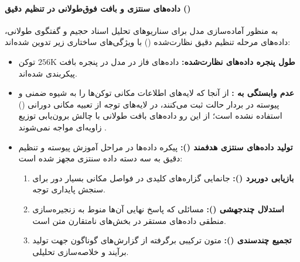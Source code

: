 \paragraph*{داده‌های سنتزی و بافت فوق‌طولانی در تنظیم دقیق ()}
به منظور آماده‌سازی مدل برای سناریوهای تحلیل اسناد حجیم و گفتگوی طولانی، داده‌های مرحله تنظیم دقیق نظارت‌شده () با ویژگی‌های ساختاری زیر تدوین شده‌اند:
\begin{itemize}
    \item \textbf{طول پنجره داده‌های نظارت‌شده:} داده‌های فاز  در مدل  در پنجره بافت $256\text{K}$ توکن پیکربندی شده‌اند.
    \item \textbf{عدم وابستگی به :} از آنجا که لایه‌های  اطلاعات مکانی توکن‌ها را به شیوه ضمنی و پیوسته در بردار حالت ثبت می‌کنند، در لایه‌های توجه از تعبیه مکانی دورانی () استفاده نشده است؛ از این رو داده‌های بافت طولانی با چالش برون‌یابی توزیع زاویه‌ای مواجه نمی‌شوند \cite{puvvada2025swan}.
    \item \textbf{تولید داده‌های سنتزی هدفمند ():} پیکره داده‌ها در مراحل آموزش پیوسته و تنظیم دقیق به سه دسته داده سنتزی مجهز شده است:
    \begin{enumerate}
        \item \textbf{بازیابی دوربرد ():} جانمایی گزاره‌های کلیدی در فواصل مکانی بسیار دور برای سنجش پایداری توجه.
        \item \textbf{استدلال چندجهشی ():} مسائلی که پاسخ نهایی آن‌ها منوط به زنجیره‌سازی منطقی داده‌های مستقر در بخش‌های نامتقارن متن است.
        \item \textbf{تجمیع چندسندی ():} متون ترکیبی برگرفته از گزارش‌های گوناگون جهت تولید برآیند و خلاصه‌سازی تحلیلی.
    \end{enumerate}
\end{itemize}

